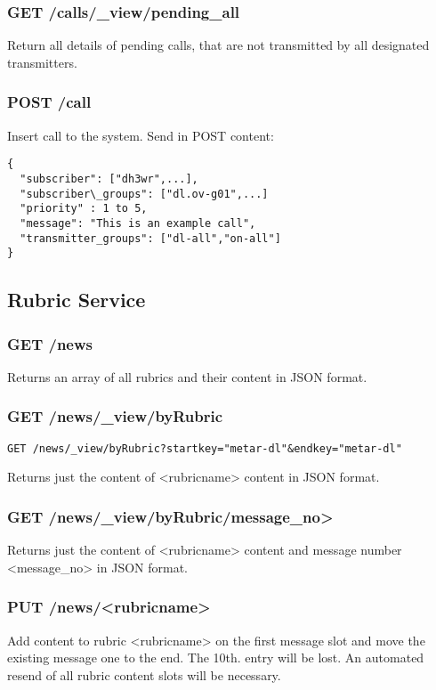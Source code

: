 \subsubsection{GET /calls/\_view/pending\_all}
Return all details of pending calls, that are not transmitted by all designated transmitters.

\subsubsection{POST /call}
Insert call to the system. Send in POST content:
\begin{lstlisting}
{
  "subscriber": ["dh3wr",...],
  "subscriber\_groups": ["dl.ov-g01",...]
  "priority" : 1 to 5,
  "message": "This is an example call",
  "transmitter_groups": ["dl-all","on-all"]
}
\end{lstlisting}

\subsection{Rubric Service}

\subsubsection{GET /news}
Returns an array of all rubrics and their content in JSON format.

\subsubsection{GET /news/\_view/byRubric}
\begin{verbatim}
GET /news/_view/byRubric?startkey="metar-dl"&endkey="metar-dl"
\end{verbatim}

Returns just the content of <rubricname> content in JSON format.

\subsubsection{GET /news/\_view/byRubric/message\_no>}
Returns just the content of <rubricname> content and message number <message\_no> in JSON format.

\subsubsection{PUT /news/<rubricname>}
Add content to rubric <rubricname> on the first message slot and move the existing message one to the end. The 10th. entry will be lost. An automated resend of all rubric content slots will be necessary.

